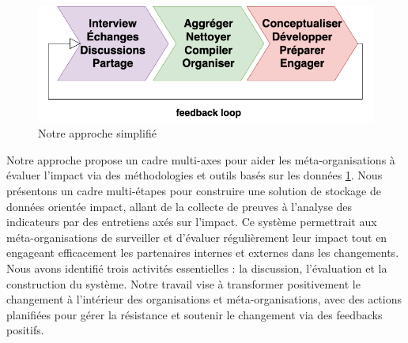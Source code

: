 \begin{figure}
    \centering
    \includegraphics[width=0.75\linewidth]{images/Diagrams-Simplified framework chain Our approach.png}
    \caption{Notre approche simplifié}
    \label{fig:simplified-approach}
\end{figure}

Notre approche propose un cadre multi-axes pour aider les méta-organisations à évaluer l'impact via des méthodologies et outils basés sur les données \ref{fig:simplified-approach}. Nous présentons un cadre multi-étapes pour construire une solution de stockage de données orientée impact, allant de la collecte de preuves à l'analyse des indicateurs par des entretiens axés sur l'impact. Ce système permettrait aux méta-organisations de surveiller et d'évaluer régulièrement leur impact tout en engageant efficacement les partenaires internes et externes dans les changements. Nous avons identifié trois activités essentielles : la discussion, l'évaluation et la construction du système. Notre travail vise à transformer positivement le changement à l'intérieur des organisations et méta-organisations, avec des actions planifiées pour gérer la résistance et soutenir le changement via des feedbacks positifs. 